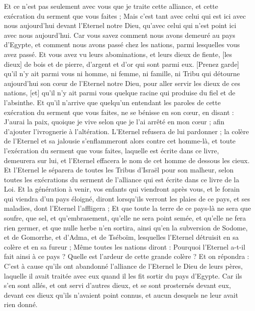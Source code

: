 \begin{multicols}{2}
Et ce n'est pas seulement avec vous que je traite cette alliance, et cette exécration du serment que vous faites ;
Mais c'est tant avec celui qui est ici avec nous aujourd'hui devant l'Eternel notre Dieu, qu'avec celui qui n'est point ici avec nous aujourd'hui.
Car vous savez comment nous avons demeuré au pays d'Egypte, et comment nous avons passé chez les nations, parmi lesquelles vous avez passé.
Et vous avez vu leurs abominations, et leurs dieux de fiente, [les dieux] de bois et de pierre, d'argent et d'or qui sont parmi eux.
[Prenez garde] qu'il n'y ait parmi vous ni homme, ni femme, ni famille, ni Tribu qui détourne aujourd'hui son cœur de l'Eternel notre Dieu, pour aller servir les dieux de ces nations, [et] qu'il n'y ait parmi vous quelque racine qui produise du fiel et de l'absinthe.
Et qu'il n'arrive que quelqu'un entendant les paroles de cette exécration du serment que vous faites, ne se bénisse en son cœur, en disant : J'aurai la paix, quoique je vive selon que je l'ai arrêté en mon cœur ; afin d'ajouter l'ivrognerie à l'altération.
L'Eternel refusera de lui pardonner ; la colère de l'Eternel et sa jalousie s'enflammeront alors contre cet homme-là, et toute l'exécration du serment que vous faites, laquelle est écrite dans ce livre, demeurera sur lui, et l'Eternel effacera le nom de cet homme de dessous les cieux.
Et l'Eternel le séparera de toutes les Tribus d'Israël pour son malheur, selon toutes les exécrations du serment de l'alliance qui est écrite dans ce livre de la Loi.
Et la génération à venir, vos enfants qui viendront après vous, et le forain qui viendra d'un pays éloigné, diront lorsqu'ils verront les plaies de ce pays, et ses maladies, dont l'Eternel l'affligera ;
Et que toute la terre de ce pays-là ne sera que soufre, que sel, et qu'embrasement, qu'elle ne sera point semée, et qu'elle ne fera rien germer, et que nulle herbe n'en sortira, ainsi qu'en la subversion de Sodome, et de Gomorrhe, et d'Adma, et de Tséboïm, lesquelles l'Eternel détruisit en sa colère et en sa fureur ;
Même toutes les nations diront : Pourquoi l'Eternel a-t-il fait ainsi à ce pays ? Quelle est l'ardeur de cette grande colère ?
Et on répondra : C'est à cause qu'ils ont abandonné l'alliance de l'Eternel le Dieu de leurs pères, laquelle il avait traitée avec eux quand il les fit sortir du pays d'Egypte.
Car ils s'en sont allés, et ont servi d'autres dieux, et se sont prosternés devant eux, devant ces dieux qu'ils n'avaient point connus, et aucun desquels ne leur avait rien donné.

\end{multicols}
